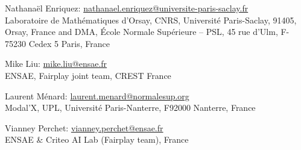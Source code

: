 \documentclass[11pt]{article}
\begin{document}
\printbibliography


\bigskip

{Nathanaël Enriquez: \href{mailto:nathanael:enriquez@universite-paris-saclay.fr}{nathanael.enriquez@universite-paris-saclay.fr}}\\
{Laboratoire de Mathématiques d’Orsay, CNRS, Université Paris-Saclay, 91405, Orsay, France
and DMA, \'Ecole Normale Supérieure – PSL, 45 rue d’Ulm, F-75230 Cedex 5 Paris, France}

\medskip

{Mike Liu: \href{mailto:mike.liu@ensae.fr}{mike.liu@ensae.fr}}\\
{ENSAE, Fairplay joint team, CREST France}

\medskip

{Laurent Ménard: \href{mailto:laurent.menard@normalesup.org}{laurent.menard@normalesup.org}}\\
{Modal'X, UPL, Université Paris-Nanterre, F92000 Nanterre, France}  

\medskip

{Vianney Perchet: \href{mailto:vianney.perchet@ensae.fr}{vianney.perchet@ensae.fr}}\\
{ENSAE \& Criteo AI Lab (Fairplay team), France}
\end{document}
